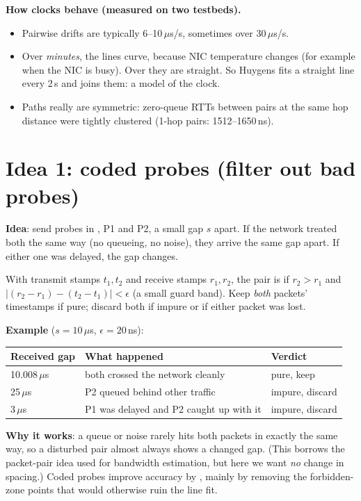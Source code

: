 \textbf{How clocks behave (measured on two testbeds).}
\begin{itemize}
  \item Pairwise drifts are typically 6--10\,$\mu$s/s, sometimes over 30\,$\mu$s/s.
  \item Over \emph{minutes}, the lines curve, because NIC temperature changes (for example when the NIC is busy). Over  they are straight. So
        Huygens fits a straight line every 2\,s and joins them: a  model of the clock.
  \item Paths really are symmetric: zero-queue RTTs between pairs at the same hop distance were tightly clustered (1-hop pairs: 1512--1650\,ns).
\end{itemize}

\section{Idea 1: coded probes (filter out bad probes)}


\textbf{Idea}: send probes in , P1 and P2, a small gap $s$ apart. If the network treated both the same way (no queueing, no noise),
they arrive the same gap apart. If either one was delayed, the gap changes.

\begin{keybox}
With transmit stamps $t_1, t_2$ and receive stamps $r_1, r_2$, the pair is  if $r_2 > r_1$ and $\big|(r_2 - r_1) - (t_2 - t_1)\big| < \epsilon$
(a small guard band). Keep \emph{both} packets' timestamps if pure; discard both if impure or if either packet was lost.
\end{keybox}

\textbf{Example} ($s = 10\,\mu$s, $\epsilon = 20$\,ns):
\begin{center}
\begin{tabular}{@{}lll@{}}
\toprule
Received gap & What happened & Verdict\\
\midrule
10.008\,$\mu$s & both crossed the network cleanly & pure, keep\\
25\,$\mu$s & P2 queued behind other traffic & impure, discard\\
3\,$\mu$s & P1 was delayed and P2 caught up with it & impure, discard\\
\bottomrule
\end{tabular}
\end{center}
\textbf{Why it works}: a queue or noise rarely hits both packets in exactly the same way, so a disturbed pair almost always shows a changed gap.
(This borrows the packet-pair idea used for bandwidth estimation, but here we want \emph{no} change in spacing.) Coded probes improve accuracy
by , mainly by removing the forbidden-zone points that would otherwise ruin the line fit.

